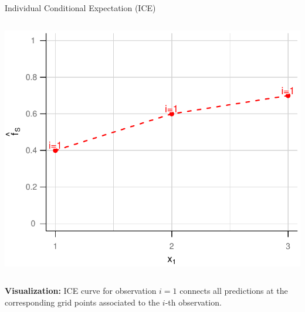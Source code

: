 \documentclass[11pt,compress,t,notes=noshow, xcolor=table]{beamer}
\begin{document}
\begin{vbframe}{Individual Conditional Expectation (ICE)}
\begin{columns}[T]
\begin{column}{0.45\textwidth}
\begin{center}
\includegraphics[page=1, width=\textwidth]{figure_man/ICE}
\end{center}

\end{column}
\end{columns}
\vspace*{\topsep}

\textbf{Visualization:} ICE curve for observation $i=1$ connects all predictions at the corresponding grid points associated to the $i$-th observation.

\framebreak


\end{vbframe}
\end{document}

